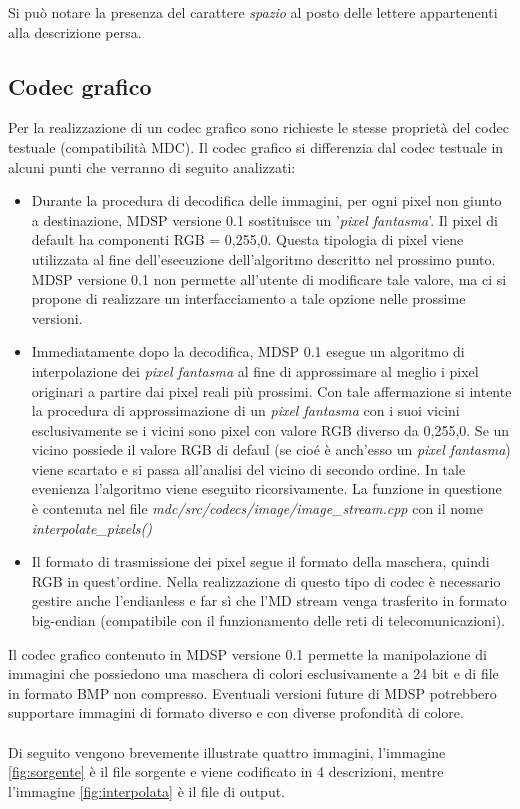 Si può notare la presenza del carattere \emph{spazio} al posto delle lettere
appartenenti alla descrizione persa.

\subsection{Codec grafico}
Per la realizzazione di un codec grafico sono richieste le stesse proprietà del
codec testuale (compatibilità MDC). Il codec grafico si differenzia dal codec
testuale in alcuni punti che verranno di seguito analizzati:

\begin{itemize}
  \item Durante la procedura di decodifica delle immagini, per ogni pixel
  non giunto a destinazione, MDSP versione 0.1 sostituisce un '\emph{pixel
  fantasma}'. Il pixel di default ha componenti RGB = 0,255,0. Questa
  tipologia di pixel viene utilizzata al fine dell'esecuzione dell'algoritmo
  descritto nel prossimo punto. MDSP versione 0.1 non permette all'utente di
  modificare tale valore, ma ci si propone di realizzare un interfacciamento a tale opzione nelle prossime versioni.
  \item Immediatamente dopo la decodifica, MDSP 0.1 esegue un algoritmo di
  interpolazione dei \emph{pixel fantasma} al fine di approssimare al meglio i
  pixel originari a partire dai pixel reali più prossimi. Con tale affermazione
  si intente la procedura di approssimazione di un \emph{pixel fantasma} con i
  suoi vicini esclusivamente se i vicini sono pixel con valore RGB diverso da
  0,255,0. Se un vicino possiede il valore RGB di defaul (se cioé è anch'esso
  un \emph{pixel fantasma}) viene scartato e si passa all'analisi del vicino di
  secondo ordine. In tale evenienza l'algoritmo viene eseguito ricorsivamente.
  La funzione in questione è contenuta nel file
  \textit{mdc/src/codecs/image/image\_stream.cpp} con il nome
  \textit{interpolate\_pixels()}
  \item Il formato di trasmissione dei pixel segue il formato della maschera,
  quindi RGB in quest'ordine. Nella realizzazione di questo tipo di codec è
  necessario gestire anche l'endianless e far sì che l'MD stream venga
  trasferito in formato big-endian (compatibile con il funzionamento delle reti
  di telecomunicazioni).
\end{itemize}

Il codec grafico contenuto in MDSP versione 0.1 permette la manipolazione di
immagini che possiedono una maschera di colori esclusivamente a 24 bit e di
file in formato BMP non compresso. Eventuali versioni future di MDSP potrebbero
supportare immagini di formato diverso e con diverse profondità di colore.
\\\\
Di seguito vengono brevemente illustrate quattro immagini, l'immagine
\ref{fig:sorgente} è il file sorgente e viene codificato in 4 descrizioni,
mentre l'immagine \ref{fig:interpolata} è il file di output.

